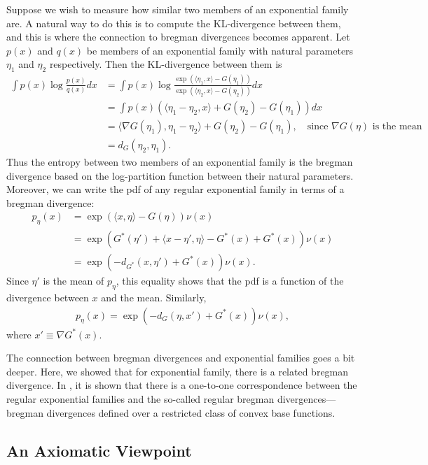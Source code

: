 \documentclass{article}
\begin{document}
Suppose we wish to measure how similar two members of an exponential
family are.  A natural way to do this is to compute the KL-divergence
between them, and this is where the connection to bregman divergences
becomes apparent.  Let $p(x)$ and $q(x)$ be members of an exponential
family with natural parameters $\eta_1$ and $\eta_2$ respectively.
Then the KL-divergence between them is
\begin{align*}
\int p(x) \log\frac{p(x)}{q(x)}dx &=\int p(x)\log\frac{\exp(\langle\eta_1,x\rangle
  -G(\eta_1))}{\exp(\langle\eta_2,x\rangle -G(\eta_2))} dx\\
&= \int p(x) (\langle \eta_1-\eta_2,x\rangle +G(\eta_2) - G(\eta_1)
)dx\\
&= \langle \nabla G(\eta_1), \eta_1-\eta_2 \rangle + G(\eta_2) -
G(\eta_1), \quad\mbox{since }\nabla G(\eta)\mbox{ is the mean} \\
&=d_G(\eta_2,\eta_1).
\end{align*}
Thus the entropy between two members of an exponential family is the
bregman divergence based on the log-partition function between their
natural parameters.  Moreover, we can write the pdf of any regular
exponential family in terms of a bregman divergence:
\begin{align*}
p_{\eta}(x) &= \exp(\langle x,\eta \rangle - G(\eta)) \nu(x)\\
&= \exp(G^*(\eta ')+ \langle x-\eta',\eta \rangle - G^*(x)+G^*(x))
\nu(x)\\
&=\exp(-d_{G^*}(x,\eta') + G^*(x) )\nu(x).
\end{align*}
Since $\eta'$ is the mean of $p_{\eta}$, this equality shows
that the pdf is a function of the divergence between $x$ and the mean.
Similarly, 
\begin{align*}
p_{\eta}(x) = \exp(-d_G(\eta,x') + G^*(x))\nu(x),
\end{align*}
where $x'\equiv \nabla G^*(x)$.  

The connection between bregman divergences and exponential families
goes a bit deeper.  Here, we showed that for exponential family, there
is a related bregman divergence.  In \cite{bm.05}, it is shown that
there is a one-to-one correspondence between the regular exponential
families and the so-called regular bregman divergences---bregman
divergences defined over a restricted class of convex base functions.  

\subsection{An Axiomatic Viewpoint}

\end{document}
